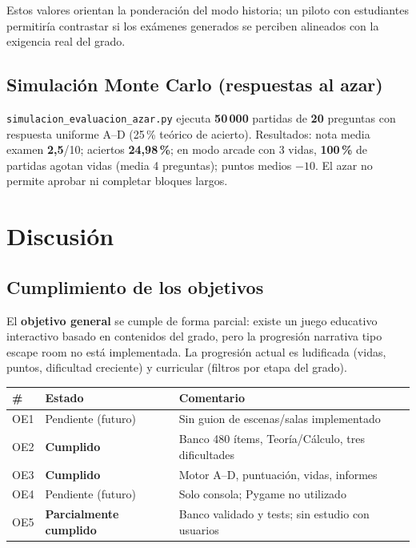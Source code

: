 \documentclass[11pt,a4paper]{article}
\newcommand{\iniciotabla}{\par\medskip\renewcommand{\arraystretch}{1.12}}
\newcommand{\fintabla}{\par\medskip}
\begin{document}
Estos valores orientan la ponderación del modo historia; un piloto con estudiantes permitiría contrastar si los exámenes generados se perciben alineados con la exigencia real del grado.

\subsection{Simulación Monte Carlo (respuestas al azar)}

\texttt{simulacion\_evaluacion\_azar.py} ejecuta \textbf{50\,000} partidas de \textbf{20} preguntas con respuesta uniforme A--D (25\,\% teórico de acierto). Resultados: nota media examen \textbf{2,5}/10; aciertos \textbf{24,98\,\%}; en modo arcade con 3 vidas, \textbf{100\,\%} de partidas agotan vidas (media 4 preguntas); puntos medios \textbf{$-10$}. El azar no permite aprobar ni completar bloques largos.

\section{Discusión}

\subsection{Cumplimiento de los objetivos}

El \textbf{objetivo general} se cumple de forma parcial: existe un juego educativo interactivo basado en contenidos del grado, pero la progresión narrativa tipo escape room no está implementada. La progresión actual es ludificada (vidas, puntos, dificultad creciente) y curricular (filtros por etapa del grado).

\iniciotabla
\begin{tabular}{@{}llp{6.5cm}@{}}
\toprule
\textbf{\#} & \textbf{Estado} & \textbf{Comentario} \\
\midrule
OE1 & Pendiente (futuro) & Sin guion de escenas/salas implementado \\
OE2 & \textbf{Cumplido} & Banco 480 ítems, Teoría/Cálculo, tres dificultades \\
OE3 & \textbf{Cumplido} & Motor A--D, puntuación, vidas, informes \\
OE4 & Pendiente (futuro) & Solo consola; Pygame no utilizado \\
OE5 & \textbf{Parcialmente cumplido} & Banco validado y tests; sin estudio con usuarios \\
\bottomrule
\end{tabular}
\fintabla
\end{document}

